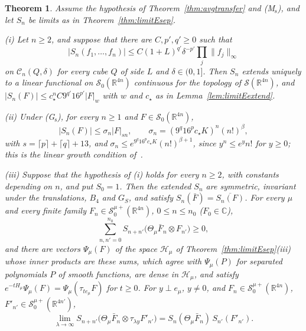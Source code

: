 \documentclass[aps,prd,twocolumn,superscriptaddress,nofootinbib,longbibliography,floatfix,amsmath,amssymb,10pt]{revtex4-2}
\newtheorem{theorem}{Theorem}
\theoremstyle{definition}
\theoremstyle{remark}
\newcommand{\R}{\mathbb{R}}
\newcommand{\C}{\mathbb{C}}
\begin{document}
\begin{theorem}\label{thm:limitEtempered}
Assume the hypothesis of Theorem~\textup{\ref{thm:avgtransfer}} and
\textup{(M$_{\mathrm s}$)}, and let $S_n$ be limits as in
Theorem~\textup{\ref{thm:limitEsep}}.

\textup{(i)} Let $n\ge2$, and suppose that there are $C,p',q'\ge0$ such that
\[
|S_n(f_1,\dots,f_n)|\le C(1+L)^{q'}\delta^{-p'}\prod_j\|f_j\|_\infty
\]
on $\mathcal C_n(Q,\delta)$ for every cube $Q$ of side $L$ and
$\delta\in(0,1]$. Then $S_n$
extends uniquely to a linear functional on $\mathcal S_0(\R^{4n})$ continuous
for the topology of $\mathcal S(\R^{4n})$, and $|S_n(F)|\le c_\star^nC9^{q'}
16^{p'}|F|_w$ with $w$ and $c_\star$ as in
Lemma~\textup{\ref{lem:limitEextend}}.

\textup{(ii)} Under \textup{(G$_{\mathrm s}$)}, for every $n\ge1$ and
$F\in\mathcal S_0(\R^{4n})$,
\[
|S_n(F)|\le\sigma_n|F|_{sn},\qquad\sigma_n=(9^q16^pc_\star K)^n(n!)^\beta,
\]
with $s=\lceil p\rceil+\lceil q\rceil+13$, and $\sigma_n\le e^{9^q16^pc_\star K}(n!)^{\beta+1}$, since $y^n\le e^yn!$ for
$y\ge0$; this is the linear growth condition of~\cite{OS75}.

\textup{(iii)} Suppose that the hypothesis of \textup{(i)} holds for every
$n\ge2$, with constants depending on $n$, and put $S_0=1$. Then the extended
$S_n$ are symmetric, invariant under the translations, $B_4$ and $G_S$, and
satisfy $S_n(\bar F)=\overline{S_n(F)}$. For every $\mu$ and every finite
family $F_n\in\mathcal S^{\mu+}_0(\R^{4n})$, $0\le n\le n_0$ \textup{(}$F_0\in
\C$\textup{)},
\[
\sum_{n,n'=0}^{n_0}S_{n+n'}\bigl(\Theta_\mu\bar F_n\otimes F_{n'}\bigr)\ge0 ,
\]
and there are vectors $\Psi_\mu(F)$ of the space $\mathcal H_\mu$ of
Theorem~\textup{\ref{thm:limitEsep}(iii)} whose inner products are these
sums, which agree with $\Psi_\mu(P)$ for separated polynomials $P$ of smooth
functions, are dense in $\mathcal H_\mu$, and satisfy
$e^{-tH_\mu}\Psi_\mu(F)=\Psi_\mu(\tau_{te_\mu}F)$ for $t\ge0$. For
$y\perp e_\mu$, $y\ne0$, and $F_n\in\mathcal S^{\mu+}_0(\R^{4n})$,
$F'_{n'}\in\mathcal S^{\mu+}_0(\R^{4n'})$,
\[
\lim_{\lambda\to\infty}S_{n+n'}\bigl(\Theta_\mu\bar F_n\otimes\tau_{\lambda y}
F'_{n'}\bigr)=S_n(\Theta_\mu\bar F_n)\,S_{n'}(F'_{n'}) .
\]
\end{theorem}
\end{document}
